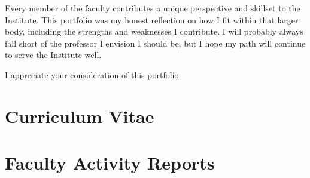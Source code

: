 \documentclass[
  letterpaper,
  DIV=11,
  numbers=noendperiod]{scrreprt}
\begin{document}
Every member of the faculty contributes a unique perspective and
skillset to the Institute. This portfolio was my honest reflection on
how I fit within that larger body, including the strengths and
weaknesses I contribute. I will probably always fall short of the
professor I envision I should be, but I hope my path will continue to
serve the Institute well.

I appreciate your consideration of this portfolio.

\cleardoublepage
{}
{}
\appendix

\chapter{Curriculum Vitae}\label{curriculum-vitae}




\chapter{Faculty Activity Reports}\label{faculty-activity-reports}















\end{document}
